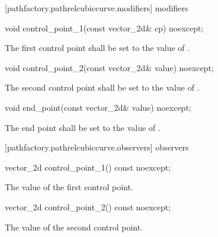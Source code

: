 [pathfactory.pathrelcubiccurve.modifiers]{ modifiers}

\begin{itemdecl}
    void control_point_1(const vector_2d& cp) noexcept;
\end{itemdecl}
\begin{itemdescr}
	\pnum
	\effects
	The first control point shall be set to the value of .
\end{itemdescr}

\begin{itemdecl}
    void control_point_2(const vector_2d& value) noexcept;
\end{itemdecl}
\begin{itemdescr}
	\pnum
	\effects
	The second control point shall be set to the value of .
\end{itemdescr}

\begin{itemdecl}
    void end_point(const vector_2d& value) noexcept;
\end{itemdecl}
\begin{itemdescr}
	\pnum
	\effects
	The end point shall be set to the value of .
\end{itemdescr}

 [pathfactory.pathrelcubiccurve.observers]{ observers}

\begin{itemdecl}
    vector_2d control_point_1() const noexcept;
\end{itemdecl}
\begin{itemdescr}
	\pnum
	\returns
	The value of the first control point.
\end{itemdescr}

\begin{itemdecl}
    vector_2d control_point_2() const noexcept;
\end{itemdecl}
\begin{itemdescr}
	\pnum
	\returns
	The value of the second control point.
\end{itemdescr}

